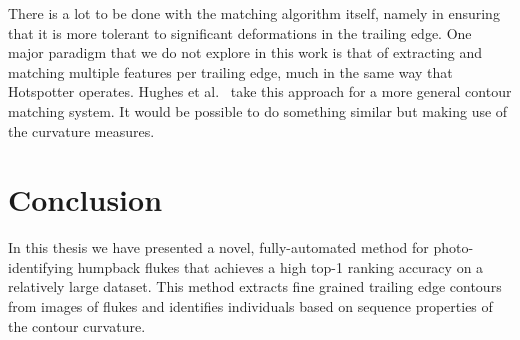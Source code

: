There is a lot to be done with the matching algorithm itself, namely in ensuring that it is more tolerant to significant deformations in the trailing edge.
One major paradigm that we do not explore in this work is that of extracting and matching multiple features per trailing edge, much in the same way that Hotspotter operates.
Hughes et al.\ \cite{hughes2015automated} take this approach for a more general contour matching system.
It would be possible to do something similar but making use of the curvature measures.


\section{Conclusion}

In this thesis we have presented a novel, fully-automated method for photo-identifying humpback flukes that achieves a high top-1 ranking accuracy on a relatively large dataset.
This method extracts fine grained trailing edge contours from images of flukes and identifies individuals based on sequence properties of the contour curvature.



